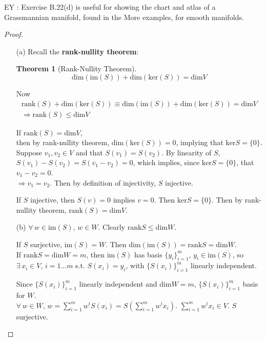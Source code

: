 \documentclass[10pt]{amsart}
\newtheorem{theorem}{Theorem}
\begin{document}
\begin{multicols*}{2}
EY : Exercise B.22(d) is useful for showing the chart and atlas of a Grassmannian manifold, found in the More examples, for smooth manifolds.  

\begin{proof}
	\begin{enumerate}
		\item[(a)] Recall the \textbf{rank-nullity theorem}:  
		\begin{theorem}[Rank-Nullity Theorem] 
\begin{equation}
\text{dim}(\text{im}(S)) + \text{dim}(\text{ker}(S)) = \text{dim}V  
\end{equation}			
			\end{theorem} 
		Now
		\[
		\begin{gathered}
		\text{rank}(S) + \text{dim}(\text{ker}(S)) \equiv \text{dim}(\text{im}(S)) + \text{dim}(\text{ker}(S)) = \text{dim}V  \\
\Longrightarrow \boxed{ 	\text{rank}(S) \leq \text{dim}V  }
\end{gathered}
		\]
		
		If $\text{rank}(S) = \text{dim}{V}$, \\
		then by rank-nullity theorem, $\text{dim}(\text{ker}(S)) = 0$, implying that $\text{ker}S = \lbrace 0 \rbrace$.  \\
		Suppose $v_1, v_2 \in V$ and that $S(v_1) = S(v_2) $.  By linearity of $S$, $S(v_1) - S(v_2) = S(v_1-v_2) = 0$, which implies, since $\text{ker}S = \lbrace 0 \rbrace$, that $v_1 - v_2 = 0$.  \\
		$\Longrightarrow v_1 = v_2$.  Then by definition of injectivity, $S$ injective.  
		
		If $S$ injective, then $S(v)=0$ implies $v=0$.  Then $\text{ker}S = \lbrace 0 \rbrace$.  Then by rank-nullity theorem, $\text{rank}(S) = \text{dim}{V}$.  
		
		\item[(b)] 		$\forall \, w \in \text{im}(S)$, $w\in W$.  Clearly $\text{rank}S \leq \text{dim}W$.  
		
		If $S$ surjective, $\text{im}(S) = W$.  Then $\text{dim}(\text{im}(S)) = \text{rank}S = \text{dim}W$.  \\
		
		If $\text{rank}S = \text{dim}W = m$, then $\text{im}(S)$ has basis $\lbrace y_i \rbrace_{i=1}^m$, $y_i \in \text{im}(S)$, so $\exists \, x_i \in V$, $i=1\dots m$ s.t. $S(x_i) = y_i$, with $\lbrace S(x_i) \rbrace_{i=1}^m $ linearly independent.  
		
		Since $\lbrace S(x_i) \rbrace_{i=1}^m$ linearly independent and $\text{dim}W = m$, $\lbrace S(x_i) \rbrace_{i=1}^m$ basis for $W$.   \\
		$\forall \, w \in W$, $w=\sum_{i=1}^m w^i S(x_i) = S(\sum_{i=1}^m w^i x_i)$.  $\sum_{i=1}^m w^i x_i \in V$.  $S$ surjective.  
		

\end{enumerate}
\end{proof}
\end{multicols*}
\end{document}
